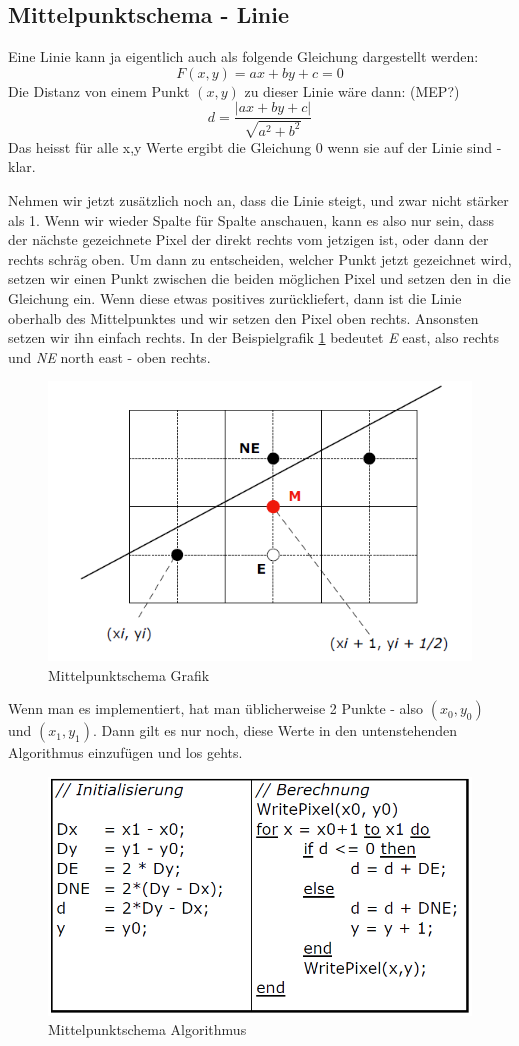 \subsection{Mittelpunktschema - Linie}
Eine Linie kann ja eigentlich auch als folgende Gleichung dargestellt werden:
\begin{displaymath}
F(x,y) = ax+by+c = 0
\end{displaymath}
Die Distanz von einem Punkt \((x,y)\) zu dieser Linie wäre dann: (MEP?)
\begin{displaymath}
d = \frac{|ax+by+c|}{\sqrt{a^2+b^2}}
\end{displaymath}
Das heisst für alle x,y Werte ergibt die Gleichung 0 wenn sie auf der Linie sind - klar.

Nehmen wir jetzt zusätzlich noch an, dass die Linie steigt, und zwar nicht stärker als 1. Wenn wir wieder Spalte für Spalte anschauen, kann es also nur sein, dass der nächste gezeichnete Pixel der direkt rechts vom jetzigen ist, oder dann der rechts schräg oben. Um dann zu entscheiden, welcher Punkt jetzt gezeichnet wird, setzen wir einen Punkt zwischen die beiden möglichen Pixel und setzen den in die Gleichung ein. Wenn diese etwas positives zurückliefert, dann ist die Linie oberhalb des Mittelpunktes und wir setzen den Pixel oben rechts. Ansonsten setzen wir ihn einfach rechts. In der Beispielgrafik \ref{fig:mittelpunktschema} bedeutet \textit{E} east, also rechts und \textit{NE} north east - oben rechts.\\
\begin{figure}[!ht]
	\centering
	\includegraphics[width=0.4\linewidth]{fig/mittelpunktschema}
	\caption{Mittelpunktschema Grafik}
	\label{fig:mittelpunktschema}
\end{figure}
Wenn man es implementiert, hat man üblicherweise 2 Punkte - also \((x_0,y_0)\) und \((x_1,y_1)\). Dann gilt es nur noch, diese Werte in den untenstehenden Algorithmus einzufügen und los gehts.
\begin{figure}[!ht]
	\centering
	\includegraphics[width=0.4\linewidth]{fig/mittelpunktschema_algo}
	\caption{Mittelpunktschema Algorithmus}
	\label{fig:mittelpunktschema_algo}
\end{figure}

